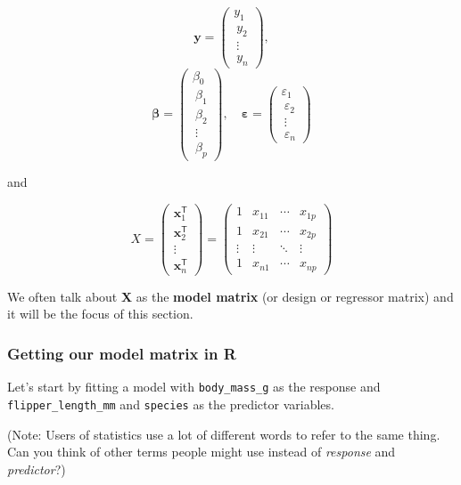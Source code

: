 \documentclass[
]{book}
\begin{document}
\[
  \mathbf{y} = \begin{pmatrix} 
y_1 \\\ 
y_2 \\\ 
\vdots \\\ 
y_n 
\end{pmatrix} ,
\]
\[
  \boldsymbol\beta = \begin{pmatrix} \beta_0  \\\ \beta_1  \\\ \beta_2  \\\ \vdots  \\\ \beta_p \end{pmatrix}, \quad
\boldsymbol\varepsilon = \begin{pmatrix} \varepsilon_1  \\\ \varepsilon_2  \\\ \vdots  \\\ \varepsilon_n \end{pmatrix}
\]

and

\[X = \begin{pmatrix} \mathbf{x}^\mathsf{T}_1 \\ \mathbf{x}^\mathsf{T}_2 \\ \vdots \\ \mathbf{x}^\mathsf{T}_n \end{pmatrix}
= \begin{pmatrix} 1 &  x_{11} & \cdots & x_{1p} \\
1 & x_{21} & \cdots & x_{2p} \\
\vdots & \vdots & \ddots & \vdots \\
1 & x_{n1} & \cdots & x_{np}
\end{pmatrix}\]

We often talk about \textbf{X} as the \textbf{model matrix} (or design or regressor matrix) and it will be the focus of this section.

\hypertarget{getting-our-model-matrix-in-r}{%
\subsubsection{Getting our model matrix in R}\label{getting-our-model-matrix-in-r}}

Let's start by fitting a model with \texttt{body\_mass\_g} as the response and \texttt{flipper\_length\_mm} and \texttt{species} as the predictor variables.

(Note: Users of statistics use a lot of different words to refer to the same thing. Can you think of other terms people might use instead of \emph{response} and \emph{predictor}?)
\end{document}
